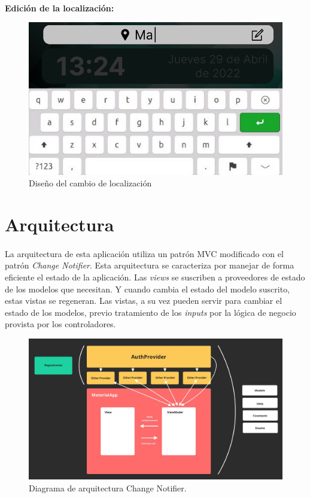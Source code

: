 \paragraph{}\textbf{Edición de la localización:}

\begin{figure}[H]
	\centering
	\includegraphics[width=0.75\linewidth]{imgs/figma-location}
	\caption[Diseño del cambio de localización]{Diseño del cambio de localización}
	\label{fig:design_location}
\end{figure}

\section{Arquitectura}

\paragraph{}La arquitectura de esta aplicación utiliza un patrón MVC modificado con el
patrón \emph{Change Notifier}. Esta arquitectura se caracteriza por manejar de forma
eficiente el estado de la aplicación. Las \emph{views} se suscriben a proveedores de
estado de los modelos que necesitan. Y cuando cambia el estado del modelo suscrito,
estas vistas se regeneran. Las vistas, a su vez pueden servir para cambiar el estado
de los modelos, previo tratamiento de los \emph{inputs} por la lógica de negocio provista
por los controladores.

\begin{figure}[H]
	\centering
	\includegraphics[width=0.85\linewidth]{figs/change-notifier}
	\caption[Arquitectura ChangeNotifier]{Diagrama de arquitectura Change Notifier.}
	\label{fig:ChangeNotifier}
\end{figure}

